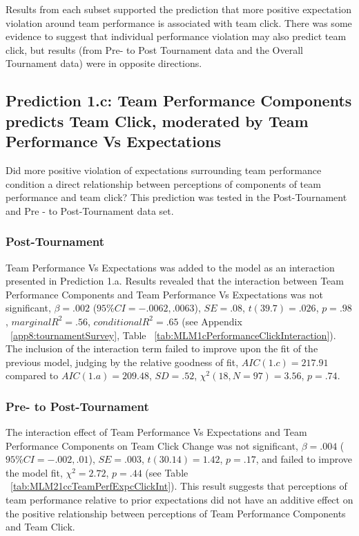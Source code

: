 \begin{CJK}{UTF8}{gbsn}
Results from each subset supported the prediction that more positive expectation violation around team performance is associated with team click.  There was some evidence to suggest that individual performance violation may also predict team click, but results (from Pre- to Post Tournament data and the Overall Tournament data) were in
opposite directions.




\subsection{Prediction 1.c: Team Performance Components predicts Team Click, moderated by Team Performance Vs Expectations}

Did more positive violation of expectations surrounding team performance condition a direct relationship between perceptions of components of team performance and team click?  This prediction was tested in the Post-Tournament and Pre - to Post-Tournament data set.

  \subsubsection{Post-Tournament}
Team Performance Vs Expectations was added to the model as an interaction presented in Prediction 1.a. Results revealed that the interaction between Team Performance Components and Team Performance Vs Expectations was not significant, $\beta = .002$ ($95\% CI =  -.0062, .0063$), $SE = .08$, $t(39.7) = .026$, $p = .98$, $marginal R^2 = .56$, $conditional R^2 = .65$ (see Appendix ~\ref{app8:tournamentSurvey}, Table ~\ref{tab:MLM1cPerformanceClickInteraction}).  The inclusion of the interaction term failed to improve upon the fit of the previous model, judging by the relative goodness of fit, $AIC(1.c) = 217.91$ compared to $AIC(1.a) = 209.48$, $SD = .52 $, $\chi^2(18, N = 97) = 3.56$, $ p =.74$.

\subsubsection{Pre- to Post-Tournament}
The interaction effect of Team Performance Vs Expectations and Team Performance Components on Team Click Change was not significant, $\beta = .004$ ($95\% CI =  -.002, .01$), $SE = .003$, $t(30.14) = 1.42$, $p = .17$, and failed to improve the model fit, $\chi^2 = 2.72$, $ p = .44$ (see Table ~\ref{tab:MLM21ccTeamPerfExpcClickInt}).  This result suggests that perceptions of team performance relative to prior expectations did not have an additive effect on the positive relationship between perceptions of Team Performance Components and Team Click.


\end{CJK}
